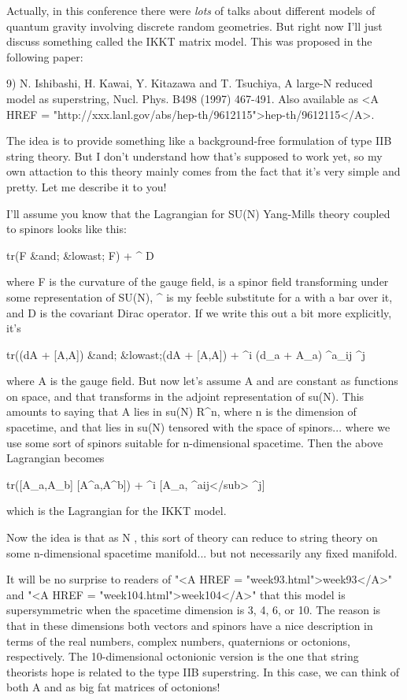 Actually, in this conference there were \emph{lots} of talks about different 
models of quantum gravity involving discrete random geometries.
But right now I'll just discuss something called the 
IKKT matrix model.  This was proposed in the following paper:

9) N. Ishibashi, H. Kawai, Y. Kitazawa and T. Tsuchiya, A large-N
reduced model as superstring, Nucl. Phys. B498 (1997) 467-491.
Also available as 
<A HREF = "http://xxx.lanl.gov/abs/hep-th/9612115">hep-th/9612115</A>.

The idea is to provide something like a background-free formulation of
type IIB string theory.  But I don't understand how that's supposed to
work yet, so my own attaction to this theory mainly comes from the fact
that it's very simple and pretty.  Let me describe it to you!

I'll assume you know that the Lagrangian for SU(N) Yang-Mills theory 
coupled to spinors looks like this:

tr(F &and; &lowast; F) + \psi ^{\dagger } D \psi 

where F is the curvature of the gauge field, \psi  is a spinor field 
transforming under some representation of SU(N), 
\psi ^{\dagger } is my feeble substitute for a \psi  with a
bar over it, and D is the covariant 
Dirac operator.  If we write this out a bit more explicitly, it's

tr((dA + [A,A]) &and; &lowast;(dA + [A,A]) + 
\psi ^{\dagger i} (d_{a} + 
A_{a}) \Gamma ^{a}_{ij} \psi ^{j}


where A is the gauge field.  But now let's assume A and \psi  are 
constant as functions on space, and that \psi  transforms in the adjoint
representation of su(N).  This amounts to saying that A lies in 
su(N) \otimes  R^{n}, where n is the dimension of spacetime, and that 
\psi  lies in su(N) tensored with the space of spinors... where we use some 
sort of spinors suitable for n-dimensional spacetime.  Then the above 
Lagrangian becomes

tr([A_{a},A_{b}] [A^{a},A^{b}]) + 
\psi ^{\dagger i} [A_{a}, \Gamma ^{a}ij</sub> 
\psi ^{j}]

which is the Lagrangian for the IKKT model.  

Now the idea is that as N \to  \infty , this sort of theory can
reduce to string theory on some n-dimensional spacetime manifold... 
but not necessarily any fixed manifold.

It will be no surprise to readers of "<A HREF = "week93.html">week93</A>" and "<A HREF = "week104.html">week104</A>" that this
model is supersymmetric when the spacetime dimension is 3, 4, 6, or 10.
The reason is that in these dimensions both vectors and spinors have a
nice description in terms of the real numbers, complex numbers, quaternions 
or octonions, respectively.  The 10-dimensional octonionic version is the 
one that string theorists hope is related to the type IIB superstring.  
In this case, we can think of both A and \psi  as big fat matrices of 
octonions!

